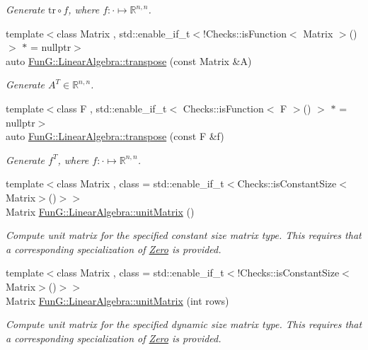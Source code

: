 \begin{DoxyCompactItemize}
\begin{DoxyCompactList}\small\item\em \-Generate $\mathrm{tr}\circ f$, where $f:\cdot\mapsto\mathbb{R}^{n,n} $. \end{DoxyCompactList}\item 
{\footnotesize template$<$class Matrix , std\-::enable\-\_\-if\-\_\-t$<$!\-Checks\-::is\-Function$<$ Matrix $>$()$>$ $\ast$  = nullptr$>$ }\\auto \hyperlink{group__LinearAlgebraGroup_ga6110875ecb3c2559f8f4b42a3627a65b}{\-Fun\-G\-::\-Linear\-Algebra\-::transpose} (const \-Matrix \&\-A)
\begin{DoxyCompactList}\small\item\em \-Generate $A^T\in\mathbb{R}^{n,n}$. \end{DoxyCompactList}\item 
{\footnotesize template$<$class F , std\-::enable\-\_\-if\-\_\-t$<$ Checks\-::is\-Function$<$ F $>$() $>$ $\ast$  = nullptr$>$ }\\auto \hyperlink{group__LinearAlgebraGroup_ga410ef1b161789c0c9f01ae5f5caf058f}{\-Fun\-G\-::\-Linear\-Algebra\-::transpose} (const \-F \&f)
\begin{DoxyCompactList}\small\item\em \-Generate $f^T$, where $f:\cdot\mapsto\mathbb{R}^{n,n} $. \end{DoxyCompactList}\item 
{\footnotesize template$<$class Matrix , class  = std\-::enable\-\_\-if\-\_\-t$<$\-Checks\-::is\-Constant\-Size$<$\-Matrix$>$()$>$$>$ }\\\-Matrix \hyperlink{group__LinearAlgebraGroup_ga88a596b8526c0ed98ce241244fb85948}{\-Fun\-G\-::\-Linear\-Algebra\-::unit\-Matrix} ()
\begin{DoxyCompactList}\small\item\em \-Compute unit matrix for the specified constant size matrix type. \-This requires that a corresponding specialization of \hyperlink{structFunG_1_1Zero}{\-Zero} is provided. \end{DoxyCompactList}\item 
{\footnotesize template$<$class Matrix , class  = std\-::enable\-\_\-if\-\_\-t$<$!\-Checks\-::is\-Constant\-Size$<$\-Matrix$>$()$>$$>$ }\\\-Matrix \hyperlink{group__LinearAlgebraGroup_gae50c49f62ed072019079a7563688e5de}{\-Fun\-G\-::\-Linear\-Algebra\-::unit\-Matrix} (int rows)
\begin{DoxyCompactList}\small\item\em \-Compute unit matrix for the specified dynamic size matrix type. \-This requires that a corresponding specialization of \hyperlink{structFunG_1_1Zero}{\-Zero} is provided. \end{DoxyCompactList}\end{DoxyCompactItemize}


